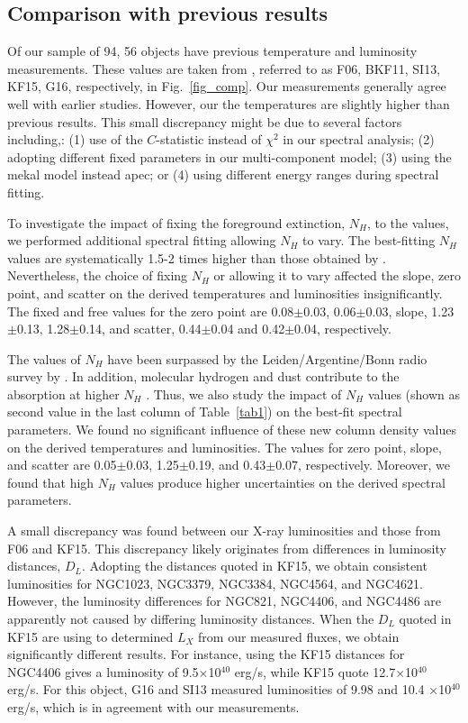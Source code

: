 \documentclass[iop]{emulateapj}
\begin{document}
\subsection{Comparison with previous results}

Of our sample of 94, 56 objects have previous temperature and luminosity measurements. These values are taken from \citet{Fukazawa:06, Boroson:10, Su:13, Kim:15, Goulding:16}, referred to as F06, BKF11, SI13, KF15, G16, respectively, in Fig.~\ref{fig_comp}. Our measurements generally agree well with earlier studies. However, our the temperatures are slightly higher than previous results.  This small discrepancy might be due to several factors including,: (1) use of the $C$-statistic instead of $\chi^2$ in our spectral analysis; (2) adopting different fixed parameters in our multi-component model; (3) using the {\sc mekal} model instead {\sc apec}; or (4) using different energy ranges during spectral fitting. 

To investigate the impact of fixing the foreground extinction, $N_H$, to the \citet{Dickey:90} values,  we performed additional spectral fitting allowing $N_H$  to vary.  The best-fitting $N_H$ values are systematically 1.5-2 times higher than those obtained by \citet{Dickey:90}.  Nevertheless, the choice of fixing $N_H$ or allowing it to vary affected the slope, zero point, and scatter on the derived temperatures and luminosities insignificantly.  The fixed and free values for the zero point are 0.08$\pm$0.03, 0.06$\pm$0.03, slope, 1.23$\pm$0.13, 1.28$\pm$0.14, and scatter, 0.44$\pm$0.04 and 0.42$\pm$0.04, respectively.

The \citet{Dickey:90} values of $N_H$ have been surpassed by the Leiden/Argentine/Bonn radio survey by \citet{Kalberla:05}. In addition, molecular hydrogen and dust contribute to the absorption at higher $N_H$ \citep{Willingale:13}. Thus, we also study the impact of \citet{Kalberla:05} $N_H$ values (shown as second value in the last column of Table~\ref{tab1}) on the best-fit spectral parameters. We found no significant influence of these new column density values on the derived temperatures and luminosities. The values for zero point, slope, and scatter are 0.05$\pm$0.03, 1.25$\pm$0.19, and 0.43$\pm$0.07, respectively. Moreover, we found that high $N_H$ values produce higher uncertainties on the derived spectral parameters.

A small discrepancy was found between our X-ray luminosities and those from F06 and KF15.  This discrepancy likely originates from differences in luminosity distances, $D_L$. Adopting the distances quoted in KF15, we obtain consistent luminosities for NGC1023, NGC3379, NGC3384, NGC4564, and NGC4621. However, the luminosity differences for NGC821, NGC4406, and NGC4486 are apparently not caused by differing luminosity distances. When the $D_L$ quoted in KF15 are using to determined $L_X$ from our measured fluxes, we obtain significantly different results. For instance, using the KF15 distances for NGC4406 gives a luminosity of 9.5$\times$10$^{40}$ erg/s, while KF15 quote 12.7$\times$10$^{40}$ erg/s. For this object, G16 and SI13 measured luminosities of 9.98 and 10.4 $\times$10$^{40}$ erg/s, which is in agreement with our measurements.
\end{document}
